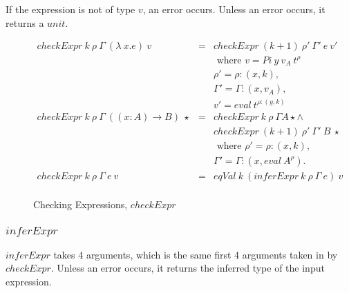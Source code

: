 \documentclass[acmsmall]{acmart}
\begin{document}
If the expression is not of type $v$, an error occurs. Unless an error occurs, it returns a $unit$.

\begin{figure}[H]
  \begin{equation*}
    \begin{aligned}
      checkExpr \: k \: \rho \: \Gamma \: (\lambda \: x.e) \: v  & = & checkExpr \: (k + 1) \: \rho' \: \Gamma' \:e \: v'          \\
                                                                 &   & \textrm{ where } v = Pi \: y \: v_A \: t^{\rho}             \\ 
                                                                 &   & \rho' = \rho : (x, k),                                      \\
                                                                 &   & \Gamma' = \Gamma : (x, v_A),                                \\
                                                                 &   & v' = eval \: t^{\rho:(y, k)}                                \\
      checkExpr \: k \: \rho \: \Gamma \: ((x:A) \to B) \: \star & = & checkExpr \: k \: \rho \: \Gamma A \star              \land \\
                                                                 &   & checkExpr \: (k+1) \: \rho' \: \Gamma' \: B \: \star        \\
                                                                 &   & \textrm{ where } \rho' = \rho : (x, k),                     \\
                                                                 &   & \Gamma' = \Gamma:(x, eval \: A^{\rho}).                     \\
      checkExpr \: k \: \rho \: \Gamma \: e \: v                 & = & eqVal \: k \: (inferExpr \: k \: \rho \: \Gamma \: e) \: v  \\
    \end{aligned}
  \end{equation*}
  \caption{Checking Expressions, $checkExpr$}
\end{figure}

\subsubsection{$inferExpr$}

$inferExpr$ takes 4 arguments, which is the same first 4 arguments taken in by $checkExpr$. Unless an error occurs, it returns the inferred type of the input expression.
\end{document}
